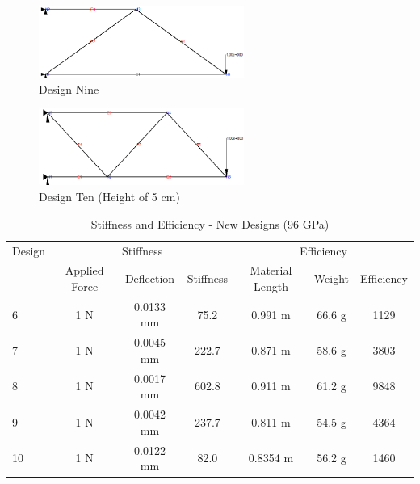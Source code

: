  \begin{figure}[p]
    \centering
    \includegraphics[width=0.6\textwidth]{images/truss4_ours}
    \caption{Design Nine}
    \label{fig:ours_4}
\end{figure}

 \begin{figure}[p]
    \centering
    \includegraphics[width=0.6\textwidth]{images/truss5_ours}
    \caption{Design Ten (Height of 5 cm)}
    \label{fig:ours_5}
\end{figure}


\begin{table}[hp]
	\centering
	\caption{Stiffness and Efficiency - New Designs (96 GPa)}
	\label{tbl:stiffness2}
	\vspace{6pt}
	\begin{tabular}{lcccccc}
		\toprule
		Design &  \multicolumn{3}{c}{Stiffness} & \multicolumn{3}{c}{Efficiency} \\
		\cmidrule(r){2-4}
		\cmidrule(r){5-7}
		 & Applied Force & Deflection & Stiffness & Material Length & Weight  & Efficiency \\
		\midrule
		6 & 1 N & 0.0133 mm  & 75.2 & 0.991 m & 66.6 g & 1129 \\
		7 & 1 N &  0.0045 mm & 222.7 & 0.871 m & 58.6 g & 3803 \\
		8 & 1 N & 0.0017 mm & 602.8 & 0.911 m & 61.2 g & 9848 \\
		9 & 1 N & 0.0042 mm & 237.7 & 0.811 m & 54.5 g &  4364 \\
		10 & 1 N & 0.0122 mm & 82.0 & 0.8354 m & 56.2 g & 1460 \\
		\bottomrule
	\end{tabular}
\end{table}
